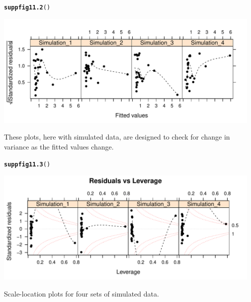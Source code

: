 \documentclass[12pt, a4paper,  BCOR=8.25mm, DIV=15]{scrartcl}\usepackage[]{graphicx}\usepackage[]{color}
\makeatletter
\newcommand{\hlstd}[1]{\textcolor[rgb]{0.345,0.345,0.345}{#1}}%
\newcommand{\hlkwd}[1]{\textcolor[rgb]{0.737,0.353,0.396}{\textbf{#1}}}%
\newenvironment{kframe}{%
 \def\at@end@of@kframe{}%
 \ifinner\ifhmode%
  \def\at@end@of@kframe{\end{minipage}}%
  \begin{minipage}{\columnwidth}%
 \fi\fi%
 \def\FrameCommand##1{\hskip\@totalleftmargin \hskip-\fboxsep
 \colorbox{shadecolor}{##1}\hskip-\fboxsep
     \hskip-\linewidth \hskip-\@totalleftmargin \hskip\columnwidth}%
 \MakeFramed {\advance\hsize-\width
   \@totalleftmargin\z@ \linewidth\hsize
   \@setminipage}}%
 {\par\unskip\endMakeFramed%
 \at@end@of@kframe}
\newenvironment{knitrout}{}{} %
\makeatother
\begin{document}
\begin{suppfigure}[H]
\begin{knitrout}
\color{fgcolor}\begin{kframe}
\begin{alltt}
\hlkwd{suppfig11.2}\hlstd{()}
\end{alltt}
\end{kframe}

{\centering \includegraphics[width=0.97\textwidth]{figs/reg-which3-s11_2e-1} 

}



\end{knitrout}
\caption{These plots, here with simulated data, are designed to
  check for change in variance as the fitted values
  change.\label{fig:mftimecheck3}}
\end{suppfigure}

\begin{suppfigure}[H]
\begin{knitrout}
\color{fgcolor}\begin{kframe}
\begin{alltt}
\hlkwd{suppfig11.3}\hlstd{()}
\end{alltt}
\end{kframe}

{\centering \includegraphics[width=0.97\textwidth]{figs/reg-simdiag3-11_3e-1} 

}



\end{knitrout}
\caption{Scale-location plots for four sets of simulated
  data.}\label{fig:mftimesimdiag3}
\end{suppfigure}
\end{document}
